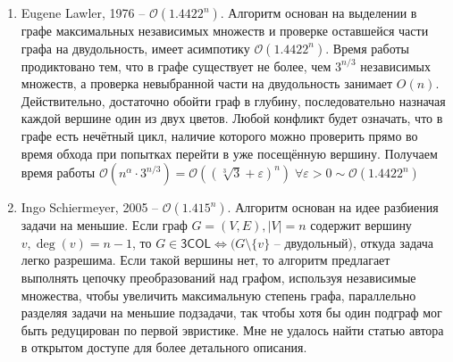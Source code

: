 \documentclass{article}
\begin{document}
\begin{enumerate}
\item Eugene Lawler, 1976\cite{1} -- $\mathcal{O}(1.4422^n)$.
\newline
Алгоритм основан на выделении в графе максимальных независимых множеств и проверке оставшейся части графа на двудольность,
имеет асимпотику $\mathcal{O}(1.4422^n)$. Время работы продиктовано тем, что в графе существует не более, чем $3^{n/3}$ независимых множеств\cite{6}, а проверка невыбранной
части на двудольность занимает $O(n)$. Действительно, достаточно обойти граф в глубину, последовательно назначая каждой вершине один из двух цветов.
Любой конфликт будет означать, что в графе есть нечётный цикл, наличие которого можно проверить прямо во время обхода при попытках перейти в уже посещённую вершину.
Получаем время работы $\mathcal{O}(n^{\alpha}\cdot 3^{n/3}) = \mathcal{O}((\sqrt[3]{3} + \varepsilon)^n)\;\forall \varepsilon > 0 \sim \mathcal{O}(1.4422^n)$

\item Ingo Schiermeyer, 2005\cite{2} -- $\mathcal{O}(1.415^n)$.
\newline
Алгоритм основан на идее разбиения задачи на меньшие.
Если граф $G=(V, E), |V|=n$ содержит вершину $v, \deg(v)=n-1$, то $G\in\mathsf{3COL} \Leftrightarrow (G\setminus\{v\}$ -- двудольный), откуда задача легко разрешима.
Если такой вершины нет, то алгоритм предлагает выполнять цепочку преобразований над графом, используя независимые множества, чтобы увеличить максимальную степень графа,
параллельно разделяя задачи на меньшие подзадачи, так чтобы хотя бы один подграф мог быть редуцирован по первой эвристике. Мне не удалось найти статью автора в открытом доступе
для более детального описания.


\end{enumerate}
\end{document}
